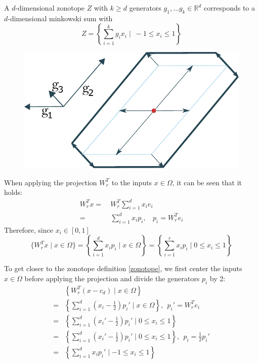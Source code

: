 \documentclass[
  a4paper,  %
  twoside,  %
  bibliography=totoc,
  headsepline,
  cleardoublepage=empty,
  parskip=half,
  draft=false
]{scrbook}
\begin{document}
\begin{definition}[Zonotopes]

A $d$-dimensional zonotope $Z$ with $k \geq d$ generators $g_1, \dots g_k \in \mathds{R}^d$ corresponds to a $d$-dimensional minkowski sum with 
\begin{equation}
Z=\left\{\sum_{i=1}^k g_i x_i \mid ~ -1 \leq x_i \leq 1\right\}
  \label{zonotope}
\end{equation}

\begin{figure}[H]
\centering
  \includegraphics[width=0.5\linewidth]{graphics/zonotope}
  \label{fig:zonotope}
\end{figure}

\end{definition}

When applying the projection $W_r^T$ to the inputs $x \in \Omega$, it can be seen that it holds:
\begin{equation}
\begin{split}
W_r^T x=~&W_r^T \sum_{i=1}^d x_i e_i\\
=~&\sum_{i=1}^d x_i p_i , ~~~~ p_i=W_r^T e_i
\end{split}
\end{equation}
Therefore, since $x_i \in [0,1]$
\begin{equation}
\{W_r^T x \mid x \in \Omega\}=\left\{\sum_{i=1}^d x_i p_i \mid x \in \Omega \right\}=\left\{ \sum_{i=1}^r x_i p_i \mid 0 \leq x_i \leq 1\right\}
\end{equation}

To get closer to the zonotope definition \ref{zonotope}, we first center the inputs $x \in \Omega$ before applying the projection and divide the generators $p_i$ by 2:
\begin{equation}
\begin{split}
&\left\{W_r^T (x - c_d) \mid x \in \Omega\right\}\\
=&\left\{\sum_{i=1}^d (x_i - \frac{1}{2}) p_i' \mid x \in \Omega \right\}, ~~ p_i'=W_r^T e_i\\
=&\left\{\sum_{i=1}^d (x_i' - \frac{1}{2}) p_i' \mid 0 \leq x_i \leq 1 \right\}\\
=&\left\{\sum_{i=1}^d (x_i' - \frac{1}{2}) p_i' \mid 0 \leq x_i \leq 1 \right\}, ~~ p_i=\frac{1}{2} p_i'\\
=&\left\{\sum_{i=1}^d x_i p_i' \mid -1 \leq x_i \leq 1 \right\}
\end{split}
\end{equation}
\end{document}
